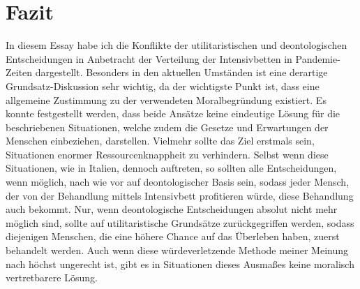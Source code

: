\documentclass[a4paper]{article}
\begin{document}
\section{Fazit}
In diesem Essay habe ich die Konflikte der utilitaristischen und deontologischen Entscheidungen in Anbetracht der Verteilung der Intensivbetten in Pandemie-Zeiten dargestellt. Besonders in den aktuellen Umständen ist eine derartige Grundsatz-Diskussion sehr wichtig, da der wichtigste Punkt ist, dass eine allgemeine Zustimmung zu der verwendeten Moralbegründung existiert. Es konnte festgestellt werden, dass beide Ansätze keine eindeutige Lösung für die beschriebenen Situationen, welche zudem die Gesetze und Erwartungen der Menschen einbeziehen, darstellen. Vielmehr sollte das Ziel erstmals sein, Situationen enormer Ressourcenknappheit zu verhindern. Selbst wenn diese Situationen, wie in Italien, dennoch auftreten, so sollten alle Entscheidungen, wenn möglich, nach wie vor auf deontologischer Basis sein, sodass jeder Mensch, der von der Behandlung mittels Intensivbett profitieren würde, diese Behandlung auch bekommt. Nur, wenn deontologische Entscheidungen absolut nicht mehr möglich sind, sollte auf utilitaristische Grundsätze zurückgegriffen werden, sodass diejenigen Menschen, die eine höhere Chance auf das Überleben haben, zuerst behandelt werden. Auch wenn diese würdeverletzende Methode meiner Meinung nach höchst ungerecht ist, gibt es in Situationen dieses Ausmaßes keine moralisch vertretbarere Lösung.

\nocite{*}
\printbibliography[heading=bibintoc]
\end{document}
